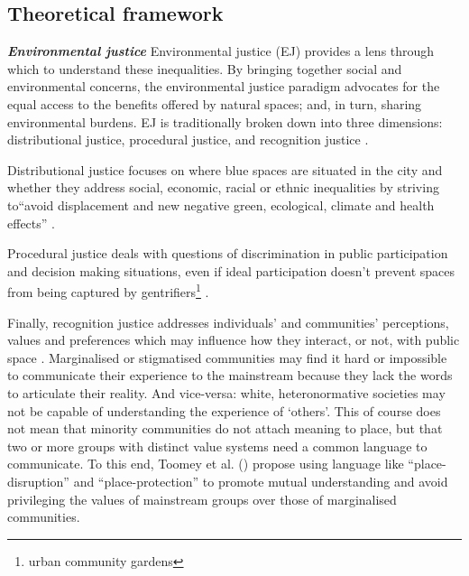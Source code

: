 \documentclass{article}
\newcommand{\bisection}[1]{\textbf{\textit{#1}}}
\begin{document}
\subsection{Theoretical framework}

\bisection{Environmental justice}
Environmental justice (EJ) provides a lens through which to understand these inequalities. By bringing together social and environmental concerns, the environmental justice paradigm advocates for the equal access to the benefits offered by natural spaces; and, in turn, sharing environmental burdens. 
EJ is traditionally broken down into three dimensions: distributional justice, procedural justice, and recognition justice \parencite{todo:cite schlosberg}.

Distributional justice focuses on where blue spaces are situated in the city and whether they address social, economic, racial or ethnic inequalities by striving to``avoid displacement and new negative green, ecological, climate and health effects'' \parencite{anguelovski2020expanding}.

Procedural justice deals with questions of discrimination in public participation and decision making situations, even if ideal participation doesn't prevent spaces from being captured by gentrifiers\footnote{urban community gardens} \parencite{anguelovski2020expanding}. 

Finally, recognition justice addresses individuals' and communities’ perceptions, values and preferences which may influence how they interact, or not, with public space \parencite{anguelovski2020expanding}.
Marginalised or stigmatised communities may find it hard or impossible to communicate their experience to the mainstream because they lack the words to articulate their reality. And vice-versa: white, heteronormative societies may not be capable of understanding the experience of `others'. This of course does not mean that minority communities do not attach meaning to place, but that two or more groups with distinct value systems need a common language to communicate. To this end, Toomey et al. (\citeyear{toomey2021place}) propose using language like ``place-disruption'' and ``place-protection'' to promote mutual understanding and avoid privileging the values of mainstream groups over those of marginalised communities.
\end{document}
